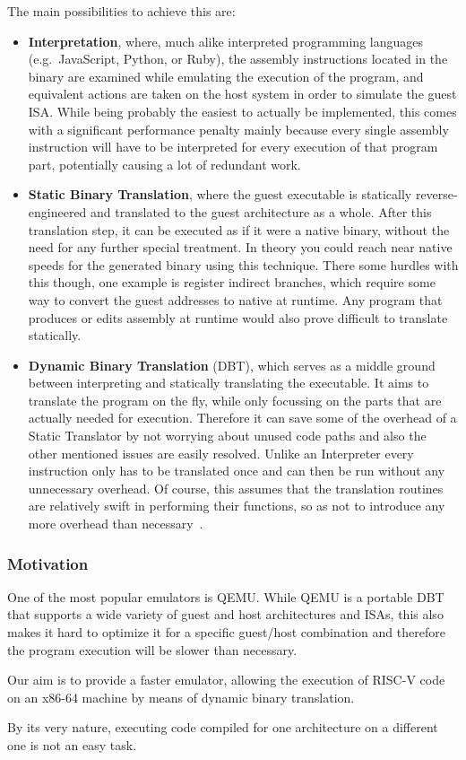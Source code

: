 The main possibilities to achieve this are:
\begin{itemize}
    \item \textbf{Interpretation}, where, much alike interpreted programming languages (e.g.\ JavaScript, Python, or Ruby), the assembly instructions located in the binary are examined while emulating the execution of the program, and equivalent actions are taken on the host system in order to simulate the guest ISA\@.
        \subitem While being probably the easiest to actually be implemented, this comes with a significant performance penalty mainly because every single assembly instruction will have to be interpreted for every execution of that program part, potentially causing a lot of redundant work.
    \item \textbf{Static Binary Translation}, where the guest executable is statically reverse-engineered and translated to the guest architecture as a whole.
    After this translation step, it can be executed as if it were a native binary, without the need for any further special treatment.
    In theory you could reach near native speeds for the generated binary using this technique.
    There some hurdles with this though, one example is register indirect branches, which require some way to convert the guest addresses to native at runtime.
    Any program that produces or edits assembly at runtime would also prove difficult to translate statically.
    \item \textbf{Dynamic Binary Translation} (DBT), which serves as a middle ground between interpreting and statically translating the executable.
    It aims to translate the program on the fly, while only focussing on the parts that are actually needed for execution.
    Therefore it can save some of the overhead of a Static Translator by not worrying about unused code paths and also the other mentioned issues are easily resolved.
    Unlike an Interpreter every instruction only has to be translated once and can then be run without any unnecessary overhead.
    Of course, this assumes that the translation routines are relatively swift in performing their functions, so as not to introduce any more overhead than necessary~\cite[S. 1f.]{bintrans}.
\end{itemize}

\subsubsection{Motivation}
One of the most popular emulators is QEMU\@.
While QEMU is a portable DBT that supports a wide variety of guest and host architectures and ISAs, this also makes it hard to optimize it for a specific guest/host combination and therefore the program execution will be slower than necessary.

Our aim is to provide a faster emulator, allowing the execution of RISC-V code on an x86-64 machine by means of dynamic binary translation.

By its very nature, executing code compiled for one architecture on a different one is not an easy task.















